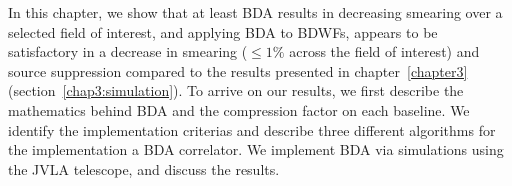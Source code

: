\documentclass[useAMS,usenatbib]{mn2e}
\begin{document}
In this chapter,  we show that at least BDA results in decreasing smearing over a selected field of interest,
and  applying BDA to BDWFs, appears to be satisfactory in a decrease in smearing ($\leq 1\%$ across the field of interest) and source suppression compared to the results presented in chapter~\ref{chapter3} (section~\ref{chap3:simulation}).
To arrive on our results, we first describe the mathematics behind BDA and the compression factor on each baseline. We identify the implementation criterias and describe three different algorithms for the implementation a 
BDA correlator. We implement BDA via simulations using the JVLA telescope, and discuss the results. 

\end{document}
